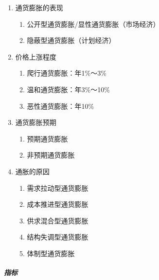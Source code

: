 \documentclass[12pt]{book}
\begin{document}
\begin{enumerate}[1.]
  \item 通货膨胀的表现
        \begin{enumerate}[(1)]
          \item 公开型通货膨胀/显性通货膨胀（市场经济）
          \item 隐蔽型通货膨胀（计划经济）
        \end{enumerate}
  \item 价格上涨程度
        \begin{enumerate}[(1)]
          \item 爬行通货膨胀：年1\%～3\%
          \item 温和通货膨胀：年3\%～10\%
          \item 恶性通货膨胀：年10\%
        \end{enumerate}
  \item 通货膨胀预期
        \begin{enumerate}[(1)]
          \item 预期通货膨胀
          \item 非预期通货膨胀
        \end{enumerate}
  \item 通胀的原因
        \begin{enumerate}[(1)]
          \item 需求拉动型通货膨胀
          \item 成本推进型通货膨胀
          \item 供求混合型通货膨胀
          \item 结构失调型通货膨胀
          \item 体制型通货膨胀
        \end{enumerate}
\end{enumerate}


\subparagraph{指标}
\end{document}
